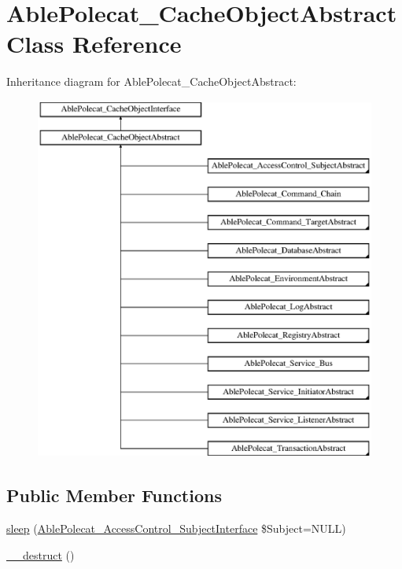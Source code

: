 \hypertarget{class_able_polecat___cache_object_abstract}{}\section{Able\+Polecat\+\_\+\+Cache\+Object\+Abstract Class Reference}
\label{class_able_polecat___cache_object_abstract}
Inheritance diagram for Able\+Polecat\+\_\+\+Cache\+Object\+Abstract\+:\begin{figure}[H]
\begin{center}
\leavevmode
\includegraphics[height=12.000000cm]{class_able_polecat___cache_object_abstract}
\end{center}
\end{figure}
\subsection*{Public Member Functions}
\begin{DoxyCompactItemize}
\item 
\hyperlink{class_able_polecat___cache_object_abstract_a099a6a845fb971e5360c24af37db25a1}{sleep} (\hyperlink{interface_able_polecat___access_control___subject_interface}{Able\+Polecat\+\_\+\+Access\+Control\+\_\+\+Subject\+Interface} \$Subject=N\+U\+L\+L)
\item 
\hyperlink{class_able_polecat___cache_object_abstract_a421831a265621325e1fdd19aace0c758}{\+\_\+\+\_\+destruct} ()
\end{DoxyCompactItemize}
